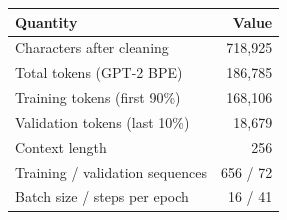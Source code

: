 \begin{tabular}{lr}
\toprule
Quantity & Value \\
\midrule
Characters after cleaning & 718,925 \\
Total tokens (GPT-2 BPE) & 186,785 \\
Training tokens (first 90\%) & 168,106 \\
Validation tokens (last 10\%) & 18,679 \\
Context length & 256 \\
Training / validation sequences & 656 / 72 \\
Batch size / steps per epoch & 16 / 41 \\
\bottomrule
\end{tabular}
